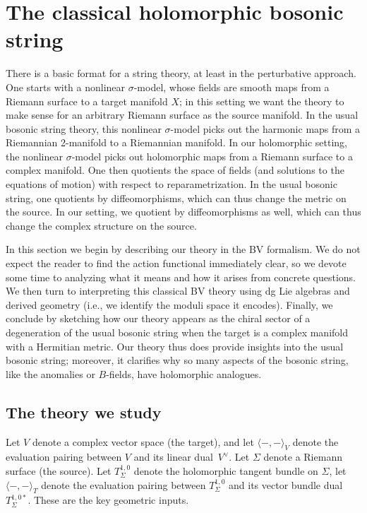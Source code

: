 \section{The classical holomorphic bosonic string}


There is a basic format for a string theory, at least in the perturbative approach. 
One starts with a nonlinear $\sigma$-model, 
whose fields are smooth maps from a Riemann surface to a target manifold $X$;
in this setting we want the theory to make sense for an arbitrary Riemann surface as the source manifold.
In the usual bosonic string theory, 
this nonlinear $\sigma$-model picks out the harmonic maps from a Riemannian 2-manifold to a Riemannian manifold.
In our holomorphic setting,
the nonlinear $\sigma$-model picks out holomorphic maps from a Riemann surface to a complex manifold.
One then quotients the space of fields (and solutions to the equations of motion) with respect to reparametrization.
In the usual bosonic string,
one quotients by diffeomorphisms, which can thus change the metric on the source.
In our setting,
we quotient by diffeomorphisms as well, which can thus change the complex structure on the source.

In this section we begin by describing our theory in the BV formalism.
We do not expect the reader to find the action functional immediately clear,
so we devote some time to analyzing what it means and how it arises from concrete questions.
We then turn to interpreting this classical BV theory using dg Lie algebras and derived geometry
(i.e., we identify the moduli space it encodes).
Finally, we conclude by sketching how our theory appears as the chiral sector of a degeneration of the usual bosonic string when the target is a complex manifold with a Hermitian metric.
Our theory thus does provide insights into the usual bosonic string;
moreover, it clarifies why so many aspects of the bosonic string,
like the anomalies or $B$-fields, 
have holomorphic analogues.

\subsection{The theory we study} 

Let $V$ denote a complex vector space (the target),
and let $\langle-,-\rangle_V$ denote the evaluation pairing between $V$ and its linear dual~$V^\vee$.
Let $\Sigma$ denote a Riemann surface (the source).
Let $T_\Sigma^{1,0}$ denote the holomorphic tangent bundle on $\Sigma$, 
let $\langle-,-\rangle_T$ denote the evaluation pairing between $T_\Sigma^{1,0}$ and its vector bundle dual~$T_\Sigma^{1,0*}$. 
These are the key geometric inputs.

